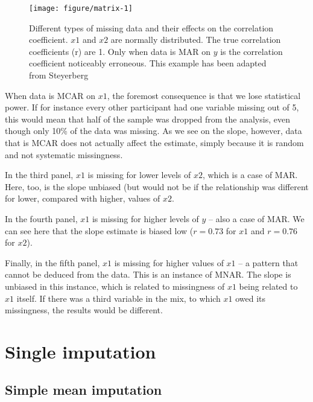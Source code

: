 \documentclass[headinclude=true, headsepline=true, DIV14]{scrartcl}\usepackage[]{graphicx}\usepackage[]{color}
\makeatletter
\def\maxwidth{ %
  \ifdim\Gin@nat@width>\linewidth
    \linewidth
  \else
    \Gin@nat@width
  \fi
}
\newenvironment{knitrout}{}{} %
\makeatother
\begin{document}
\begin{figure}[t]
\centering
\begin{knitrout}
\color{fgcolor}
\texttt{[image: figure/matrix-1]} 

\end{knitrout}
\caption{Different types of missing data and their effects on the correlation coefficient. $x1$ and $x2$ are normally distributed. The true correlation coefficients (r) are 1. Only when data is MAR on $y$ is the correlation coefficient noticeably erroneous. This example has been adapted from Steyerberg \cite{steyerberg_clinical_2009}}
\label{fig:matrix}
\end{figure}

When data is MCAR on $x1$, the foremost consequence is that we lose
statistical power. If for instance every other participant had one variable 
missing out of 5, this would mean that half of the sample was dropped from the
analysis, even though only 10\% of the data was missing. As we see on the
slope, however, data that is MCAR does not actually affect the estimate, simply
because it is random and not systematic missingness.

In the third panel, $x1$ is missing for lower levels of $x2$, which is a case of
MAR. Here, too, is the slope unbiased (but would not be if the relationship was
different for lower, compared with higher, values of $x2$.

In the fourth panel, $x1$ is missing for higher levels of $y$ -- also a case of
MAR. We can see here that the slope estimate is biased low ($r=0.73$ for $x1$
and $r=0.76$ for $x2$).

Finally, in the fifth panel, $x1$ is missing for higher values of $x1$ -- a 
pattern that cannot be deduced from the data. This is an instance of MNAR. 
The slope is unbiased in this instance, which is related to missingness of $x1$
being related to $x1$ itself. If there was a third variable in the mix,
to which $x1$ owed its missingness, the results would be different.

\section{Single imputation}

\subsection{Simple mean imputation}
\end{document}
